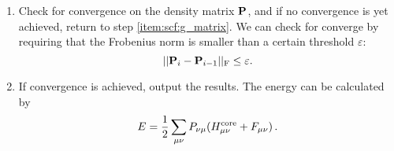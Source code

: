 \documentclass[12pt]{article}
\begin{document}
\begin{enumerate}
        \item Check for convergence on the density matrix $\vb{P}$, and if no convergence is yet achieved, return to step \ref{item:scf:g_matrix}. We can check for converge by requiring that the Frobenius norm is smaller than a certain threshold $\varepsilon$:
        \begin{equation}
            ||\vb{P}_i - \vb{P}_{i-1}||_\text{F} \leq \varepsilon .
        \end{equation}

        \item If convergence is achieved, output the results. The energy can be calculated by
        \begin{equation}
            E = \frac{1}{2} \sum_{\mu \nu} P_{\nu \mu} (H^\text{core}_{\mu \nu} + F_{\mu \nu}) \thinspace .
        \end{equation}
    \end{enumerate}






\end{document}

